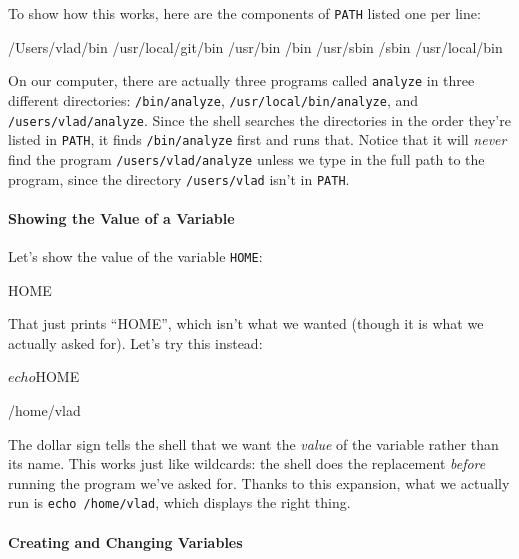 \documentclass{book}
\begin{document}
To show how this works, here are the components of \texttt{PATH} listed
one per line:

\begin{VerbOut}
/Users/vlad/bin
/usr/local/git/bin
/usr/bin
/bin
/usr/sbin
/sbin
/usr/local/bin
\end{VerbOut}

On our computer, there are actually three programs called
\texttt{analyze} in three different directories: \texttt{/bin/analyze},
\texttt{/usr/local/bin/analyze}, and \texttt{/users/vlad/analyze}. Since
the shell searches the directories in the order they're listed in
\texttt{PATH}, it finds \texttt{/bin/analyze} first and runs that.
Notice that it will \emph{never} find the program
\texttt{/users/vlad/analyze} unless we type in the full path to the
program, since the directory \texttt{/users/vlad} isn't in
\texttt{PATH}.

\mbox{}\paragraph{Showing the Value of a Variable}

Let's show the value of the variable \texttt{HOME}:


\begin{VerbOut}
HOME
\end{VerbOut}

That just prints ``HOME'', which isn't what we wanted (though it is what
we actually asked for). Let's try this instead:

\begin{VerbIn}
$ echo $HOME
\end{VerbIn}

\begin{VerbOut}
/home/vlad
\end{VerbOut}

The dollar sign tells the shell that we want the \emph{value} of the
variable rather than its name. This works just like wildcards: the shell
does the replacement \emph{before} running the program we've asked for.
Thanks to this expansion, what we actually run is
\texttt{echo /home/vlad}, which displays the right thing.

\mbox{}\paragraph{Creating and Changing Variables}
\end{document}
